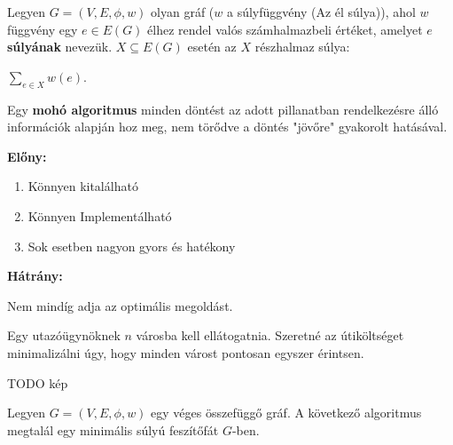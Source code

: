 \documentclass[10pt]{article}
\renewcommand{\\}{\par\noindent}
\begin{document}
\begin{frame}
\begin{tcolorbox}[title={Gráf súlya}]
Legyen $G = (V, E, {\phi}, w)$ olyan gráf ($w$ a súlyfüggvény (Az él súlya)), ahol $w$ függvény egy $e \in E(G)$ élhez rendel valós számhalmazbeli értéket, amelyet $e$ \textbf{súlyának} nevezük. $X \subseteq E(G)$ esetén az $X$ részhalmaz súlya:\\
\medskip
$\sum_{e \in X} w(e)$.
\end{tcolorbox}

\begin{tcolorbox}[title={Def.: Mohó algoritmus}]
Egy \textbf{mohó algoritmus} minden döntést az adott pillanatban rendelkezésre álló információk alapján hoz meg, nem törődve a döntés "jövőre" gyakorolt hatásával.
\end{tcolorbox}

\begin{tcolorbox}[title={Ész}]
\textbf{Előny:}\\
\medskip
\begin{enumerate}
\item Könnyen kitalálható
\item Könnyen Implementálható
\item Sok esetben nagyon gyors és hatékony
\end{enumerate}
\textbf{Hátrány:}\\
Nem mindíg adja az optimális megoldást.
\end{tcolorbox}

\begin{tcolorbox}[title={Ellenpélda: TSP / Travelling Salesman Problem}]
Egy utazóügynöknek $n$ városba kell ellátogatnia. Szeretné az útiköltséget minimalizálni úgy, hogy minden várost pontosan egyszer érintsen.\\
\bigskip
TODO kép
\end{tcolorbox}
\end{frame}

\begin{frame}
\begin{tcolorbox}[title={Tétel: Kruskal algoritmus}]
Legyen $G = (V, E, {\phi}, w)$ egy véges összefüggő gráf. A következő algoritmus megtalál egy minimális súlyú feszítőfát $G$-ben.
\end{tcolorbox}

\end{frame}
\end{document}
